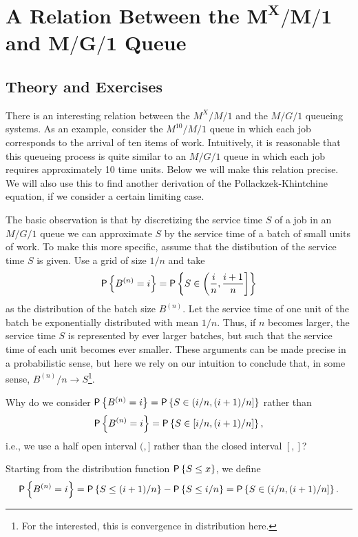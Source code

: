\section
[A Relation Between the $M^X/M/1$ and $M/G/1$  Queue]
{A Relation Between the $\mathbf{M^X/M/1}$ and $\mathbf{M/G/1}$  Queue}
\label{sec:relat-batch-queu}


\subsection*{Theory and Exercises}



There is an interesting relation between the $M^X/M/1$ and the $M/G/1$
queueing systems. As an example, consider the $M^{10}/M/1$ queue in
which each job corresponds to the arrival of ten items of
work. Intuitively, it is reasonable that this queueing process is
quite similar to an $M/G/1$ queue in which each job requires
approximately 10 time units. Below we will make this relation
precise. We will also use this to find another derivation of the
Pollackzek-Khintchine equation, if we consider a certain limiting
case.


The basic observation is that by discretizing the service time $S$ of
a job in an $M/G/1$ queue we can approximate $S$ by the service time
of a batch of small units of work. To make this more specific, assume
that the distibution of the service time $S$ is given. Use a grid of
size $1/n$ and take
\begin{equation}\label{eq:69}
  \P{B^{(n)} = i} = \P{ S\in\left(\frac in, \frac{i+1}n\right]}
\end{equation}
as the distribution of the batch size $B^{(n)}$. Let the service time
of one unit of the batch be exponentially distributed with mean $1/n$.
Thus, if $n$ becomes larger, the service time $S$ is represented by
ever larger batches, but such that the service time of each unit
becomes ever smaller. These arguments can be made precise in a
probabilistic sense, but here we rely on our intuition to conclude
that, in some sense, $B^{(n)}/n \to S$\footnote{For the interested, this is convergence in distribution here.}.

\begin{exercise}
Why do we consider $\P{B^{(n)} = i} = \P{ S\in(i/n, (i+1)/n]}$ rather than
\begin{equation*}
\P{B^{(n)} = i} = \P{S\in[i/n, (i+1)/n]},  
\end{equation*}
i.e., we use a half open interval $(,]$ rather than the closed
interval $[,]$?
\begin{solution}
  Starting from the distribution function $\P{S\leq x}$, we define
  \begin{equation*}
  \P{B^{(n)} = i} = \P{ S\leq (i+1)/n} - \P{S\leq i/n} = \P{
  S\in(i/n, (i+1)/n]}.
     \end{equation*}
\end{solution}
\end{exercise}


